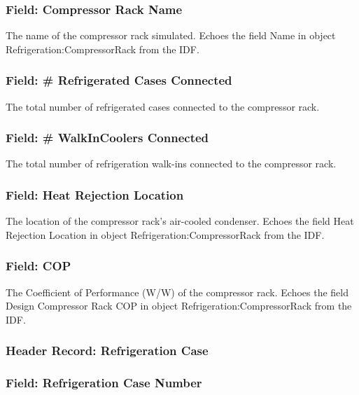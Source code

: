 \subsubsection{Field: Compressor Rack Name}\label{field-compressor-rack-name}

The name of the compressor rack simulated. Echoes the field Name in object Refrigeration:CompressorRack from the IDF.

\subsubsection{Field: \# Refrigerated Cases Connected}\label{field-refrigerated-cases-connected}

The total number of refrigerated cases connected to the compressor rack.

\subsubsection{Field: \# WalkInCoolers Connected}\label{field-walkincoolers-connected}

The total number of refrigeration walk-ins connected to the compressor rack.

\subsubsection{Field: Heat Rejection Location}\label{field-heat-rejection-location}

The location of the compressor rack's air-cooled condenser. Echoes the field Heat Rejection Location in object Refrigeration:CompressorRack from the IDF.

\subsubsection{Field: COP}\label{field-cop}

The Coefficient of Performance (W/W) of the compressor rack. Echoes the field Design Compressor Rack COP in object Refrigeration:CompressorRack from the IDF.

\subsubsection{Header Record: Refrigeration Case}\label{header-record-refrigeration-case}

\subsubsection{Field: Refrigeration Case Number}\label{field-refrigeration-case-number}

